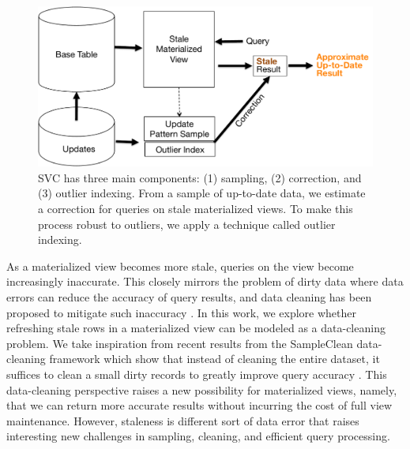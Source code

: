\begin{figure}[t]
\centering
 \includegraphics[scale=0.30]{figs/sys-arch.pdf}
 \caption{SVC has three main components: (1) sampling, (2) correction, and (3) outlier indexing. From a sample of up-to-date data, we estimate
 a correction for queries on stale materialized views. To make this process robust to outliers, we apply a technique called outlier indexing. \label{sys-arch}}
\end{figure}

As a materialized view becomes more stale, queries on the view become increasingly inaccurate.
This closely mirrors the problem of dirty data where data errors can reduce the accuracy of query results, and data cleaning has been proposed to mitigate such inaccuracy \cite{rahm2000data}.
In this work, we explore whether refreshing stale rows in a materialized view can be modeled as a data-cleaning problem.
We take inspiration from recent results from the SampleClean data-cleaning framework which show that instead of cleaning the entire dataset,
it suffices to clean a small dirty records to greatly improve query accuracy \cite{wang1999sample}.
This data-cleaning perspective raises a new possibility for materialized views, namely, that we can return more accurate results without incurring the cost of full view maintenance.
However, staleness is different sort of data error that raises interesting new challenges in sampling, cleaning, and efficient query processing.



